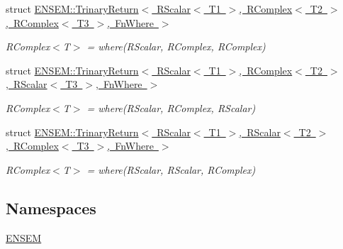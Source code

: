 \begin{DoxyCompactItemize}
\item 
struct \mbox{\hyperlink{structENSEM_1_1TrinaryReturn_3_01RScalar_3_01T1_01_4_00_01RComplex_3_01T2_01_4_00_01RComplex_3_01T3_01_4_00_01FnWhere_01_4}{E\+N\+S\+E\+M\+::\+Trinary\+Return$<$ R\+Scalar$<$ T1 $>$, R\+Complex$<$ T2 $>$, R\+Complex$<$ T3 $>$, Fn\+Where $>$}}
\begin{DoxyCompactList}\small\item\em R\+Complex$<$\+T$>$ = where(\+R\+Scalar, R\+Complex, R\+Complex) \end{DoxyCompactList}\item 
struct \mbox{\hyperlink{structENSEM_1_1TrinaryReturn_3_01RScalar_3_01T1_01_4_00_01RComplex_3_01T2_01_4_00_01RScalar_3_01T3_01_4_00_01FnWhere_01_4}{E\+N\+S\+E\+M\+::\+Trinary\+Return$<$ R\+Scalar$<$ T1 $>$, R\+Complex$<$ T2 $>$, R\+Scalar$<$ T3 $>$, Fn\+Where $>$}}
\begin{DoxyCompactList}\small\item\em R\+Complex$<$\+T$>$ = where(\+R\+Scalar, R\+Complex, R\+Scalar) \end{DoxyCompactList}\item 
struct \mbox{\hyperlink{structENSEM_1_1TrinaryReturn_3_01RScalar_3_01T1_01_4_00_01RScalar_3_01T2_01_4_00_01RComplex_3_01T3_01_4_00_01FnWhere_01_4}{E\+N\+S\+E\+M\+::\+Trinary\+Return$<$ R\+Scalar$<$ T1 $>$, R\+Scalar$<$ T2 $>$, R\+Complex$<$ T3 $>$, Fn\+Where $>$}}
\begin{DoxyCompactList}\small\item\em R\+Complex$<$\+T$>$ = where(\+R\+Scalar, R\+Scalar, R\+Complex) \end{DoxyCompactList}\end{DoxyCompactItemize}
\subsection*{Namespaces}
\begin{DoxyCompactItemize}
\item 
 \mbox{\hyperlink{namespaceENSEM}{E\+N\+S\+EM}}
\end{DoxyCompactItemize}
